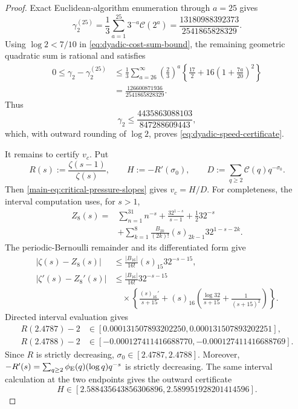 \begin{proof}
Exact Euclidean-algorithm enumeration through \(a=25\) gives
\[
 \gamma_2^{(25)}
 =\frac13\sum_{a=1}^{25}3^{-a}\mathcal C(2^a)
 =\frac{13180988392373}{2541865828329}.
\]
Using \(\log2<7/10\) in \eqref{eq:dyadic-cost-sum-bound}, the remaining
geometric quadratic sum is rational and satisfies
\[
 \begin{split}
 0\le\gamma_2-\gamma_2^{(25)}
 &\le\frac13\sum_{a=26}^{\infty}
  \left(\frac23\right)^a
  \left\{\frac{17}{2}+16\left(1+\frac{7a}{20}\right)^2\right\}\\
 &=\frac{126600871936}{2541865828329}.
 \end{split}
\]
Thus
\[
 \gamma_2\le\frac{4435863088103}{847288609443},
\]
which, with outward rounding of \(\log2\), proves
\eqref{eq:dyadic-speed-certificate}.

It remains to certify \(v_c\).  Put
\[
 R(s):=\frac{\zeta(s-1)}{\zeta(s)},
 \qquad
 H:=-R'(\sigma_0),
 \qquad
 D:=\sum_{q\ge2}\mathcal C(q)q^{-\sigma_0}.
\]
Then \eqref{main-eq:critical-pressure-slopes} gives \(v_c=H/D\).  For completeness,
the interval computation uses, for \(s>1\),
\[
 \begin{split}
 Z_8(s)={}&\sum_{n=1}^{31}n^{-s}
 +\frac{32^{1-s}}{s-1}+\frac12 32^{-s}\\
 &+\sum_{k=1}^{8}\frac{B_{2k}}{(2k)!}
       (s)_{2k-1}32^{1-s-2k}.
 \end{split}
\]
The periodic-Bernoulli remainder and its differentiated form give
\begin{align*}
 |\zeta(s)-Z_8(s)|
 &\le\frac{|B_{16}|}{16!}(s)_{15}32^{-s-15},\\
 |\zeta'(s)-Z_8'(s)|
 &\le\frac{|B_{16}|}{16!}32^{-s-15}\\
 &\quad{}\times\left\{
  \frac{(s)_{16}'}{s+15}
  +(s)_{16}\left(\frac{\log32}{s+15}
                  +\frac1{(s+15)^2}\right)
 \right\}.
\end{align*}
Directed interval evaluation gives
\[
 \begin{split}
 R(2.4787)-2&\in
 [0.000131507893202250,0.000131507893202251],\\
 R(2.4788)-2&\in
 [-0.000127411416688770,-0.000127411416688769].
 \end{split}
\]
Since \(R\) is strictly decreasing,
\(\sigma_0\in[2.4787,2.4788]\).  Moreover,
\(-R'(s)=\sum_{q\ge2}\phi_{\rm E}(q)(\log q)q^{-s}\) is strictly decreasing.
The same interval calculation at the two endpoints gives the outward
certificate
\begin{equation}
 H\in[2.588435643856306896,2.589951928201414596].
 \label{eq:H-interval-certificate}
\end{equation}


\end{proof}
